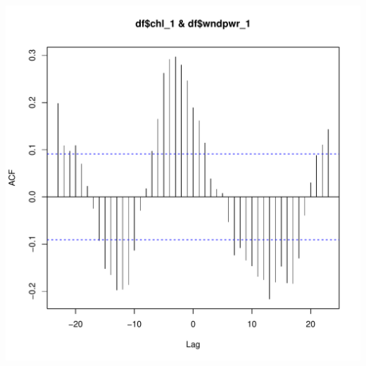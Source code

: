 \documentclass{article}\usepackage[]{graphicx}\usepackage[]{color}
\makeatletter
\def\maxwidth{ %
  \ifdim\Gin@nat@width>\linewidth
    \linewidth
  \else
    \Gin@nat@width
  \fi
}
\newenvironment{knitrout}{}{} %
\makeatother
\begin{document}
\begin{knitrout}
\includegraphics[width=\maxwidth]{figure/unnamed-chunk-27-2} 

\end{knitrout}
\end{document}
